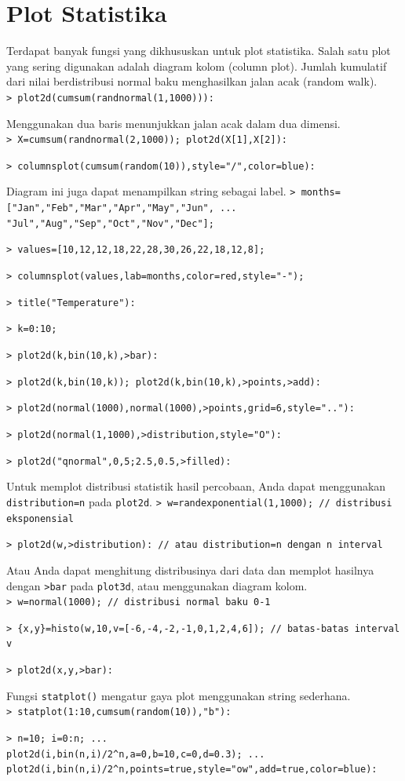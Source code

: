 \documentclass[11pt, a4paper]{article}
\newcommand{\emtcmd}[1]{\noindent\texttt{\textcolor{emtcommand}{>}\ #1}\par\smallskip}
\begin{document}
\section*{Plot Statistika}

Terdapat banyak fungsi yang dikhususkan untuk plot statistika. Salah satu plot yang sering digunakan adalah diagram kolom (column plot). Jumlah kumulatif dari nilai berdistribusi normal baku menghasilkan jalan acak (random walk).
\emtcmd{plot2d(cumsum(randnormal(1,1000))):}

Menggunakan dua baris menunjukkan jalan acak dalam dua dimensi.
\emtcmd{X=cumsum(randnormal(2,1000)); plot2d(X[1],X[2]):}
\emtcmd{columnsplot(cumsum(random(10)),style="/",color=blue):}

Diagram ini juga dapat menampilkan string sebagai label.
\emtcmd{months=["Jan","Feb","Mar","Apr","May","Jun", ... \\
\hspace*{1em} "Jul","Aug","Sep","Oct","Nov","Dec"];}
\emtcmd{values=[10,12,12,18,22,28,30,26,22,18,12,8];}
\emtcmd{columnsplot(values,lab=months,color=red,style="-");}
\emtcmd{title("Temperature"):}
\emtcmd{k=0:10;}
\emtcmd{plot2d(k,bin(10,k),>bar):}
\emtcmd{plot2d(k,bin(10,k)); plot2d(k,bin(10,k),>points,>add):}
\emtcmd{plot2d(normal(1000),normal(1000),>points,grid=6,style=".."):}
\emtcmd{plot2d(normal(1,1000),>distribution,style="O"):}
\emtcmd{plot2d("qnormal",0,5;2.5,0.5,>filled):}

Untuk memplot distribusi statistik hasil percobaan, Anda dapat menggunakan \texttt{distribution=n} pada \texttt{plot2d}.
\emtcmd{w=randexponential(1,1000); \textcolor{emtcomment}{// distribusi eksponensial}}
\emtcmd{plot2d(w,>distribution): \textcolor{emtcomment}{// atau distribution=n dengan n interval}}

Atau Anda dapat menghitung distribusinya dari data dan memplot hasilnya dengan \texttt{>bar} pada \texttt{plot3d}, atau menggunakan diagram kolom.
\emtcmd{w=normal(1000); \textcolor{emtcomment}{// distribusi normal baku 0-1}}
\emtcmd{\{x,y\}=histo(w,10,v=[-6,-4,-2,-1,0,1,2,4,6]); \textcolor{emtcomment}{// batas-batas interval v}}
\emtcmd{plot2d(x,y,>bar):}

Fungsi \texttt{statplot()} mengatur gaya plot menggunakan string sederhana.
\emtcmd{statplot(1:10,cumsum(random(10)),"b"):}
\emtcmd{n=10; i=0:n; ... \\
\hspace*{1em} plot2d(i,bin(n,i)/2\^{}n,a=0,b=10,c=0,d=0.3); ... \\
\hspace*{1em} plot2d(i,bin(n,i)/2\^{}n,points=true,style="ow",add=true,color=blue):}
\end{document}

